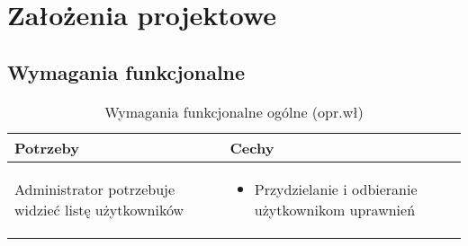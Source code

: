 \chapter{Założenia projektowe}
\section{Wymagania funkcjonalne}


\begin{minipage}{\textwidth}
    \begin{table}[H]
        \centering\caption{Wymagania funkcjonalne ogólne (opr.wł)\label{tabela:wymaganiaFunkcjonalneOgolne}}
        \begin{tabular}{|p{}|p{}|}
            \hline
            Potrzeby & Cechy \\

            \hline
            Administrator potrzebuje widzieć listę użytkowników &
            \begin{itemize}
                \item Przydzielanie i odbieranie użytkownikom uprawnień
            \end{itemize} \\
            \hline
        \end{tabular}
    \end{table}
\end{minipage}


